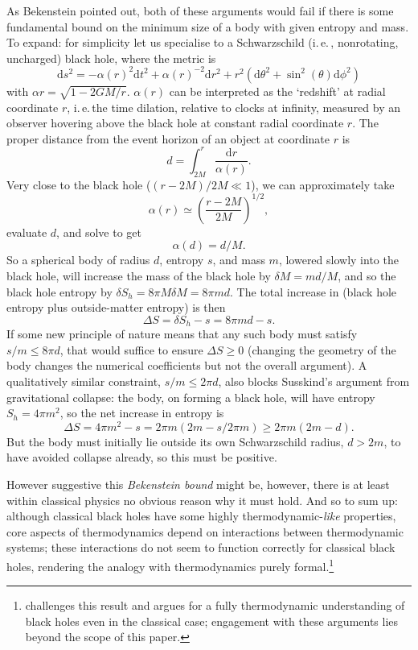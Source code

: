 \documentclass[12pt]{article}
\newcommand{\iec}{\mbox{i.\,e.\,}}
\newcommand{\be}{\begin{equation}}
\newcommand{\ee}{\end{equation}}
\begin{document}
As Bekenstein pointed out, both of these arguments would fail if there is some fundamental bound on the minimum size of a body with given entropy and mass. To expand: for simplicity let us specialise to a Schwarzschild (\iec, nonrotating, uncharged) black hole, where the metric is
\be \label{schwarzschildmetric}
\mathrm{d}s^2 = - \alpha(r)^2 \mathrm{d}t^2 + \alpha(r)^{-2} \mathrm{d}r^2 + r^2 (\mathrm{d}\theta^2 + \sin^2(\theta) \mathrm{d}\phi^2)
\ee
with $\alpha{r}=\sqrt{1-2GM/r}$. $\alpha(r)$ can be interpreted as the `redshift' at radial coordinate $r$, \iec the time dilation, relative to clocks at infinity, measured by an observer hovering above the black hole at constant radial coordinate $r$. The proper distance from the event horizon of an object at coordinate $r$ is
\be
d= \int_{2M}^r\frac{\mathrm{d}r}{\alpha(r)}.
\ee 
Very close to the black hole ($(r-2M)/2M \ll 1$), we can approximately take 
\be\alpha(r)\simeq\left( \frac{r-2M}{2M}\right)^{1/2},\ee evaluate $d$, and solve to get
\be
\alpha(d)=d/M.
\ee
So a spherical body of radius $d$, entropy $s$, and mass $m$, lowered slowly into the black hole, will increase the mass of the black hole by
$\delta M= md/M$, and so the black hole entropy by $\delta S_h = 8 \pi M \delta M= 8 \pi m d$. The total increase in (black hole entropy plus outside-matter entropy) is then
\be
\Delta S = \delta S_h - s =  8 \pi m d - s.
\ee
If some new principle of nature means that any such body must satisfy $s/m \leq 8\pi d$, that would suffice to ensure $\Delta S\geq 0$ (changing the geometry of the body changes the numerical coefficients but not the overall argument). A qualitatively similar constraint, $s/m \leq 2 \pi d$, also blocks Susskind's argument from gravitational collapse: the body, on forming a black hole, will have entropy $S_h=4\pi m^2$, so the net increase in entropy is
\be
\Delta S = 4\pi m^2 - s = 2 \pi m (2m -s/2\pi m) \geq 2\pi m (2m-d).
\ee
But the body must initially lie outside its own Schwarzschild radius, $d>2m$, to have avoided collapse already, so this must be positive. 

However suggestive this \emph{Bekenstein bound} might be, however, there is at least within classical physics no obvious reason why it must hold. And so to sum up: although classical black holes have some highly thermodynamic-\emph{like} properties, core aspects of thermodynamics depend on interactions between thermodynamic systems; these interactions do not seem to function correctly for classical black holes, rendering the analogy with thermodynamics purely formal.\footnote{ challenges this result and argues for a fully thermodynamic understanding of black holes even in the classical case; engagement with these arguments lies beyond the scope of this paper.}
 
\end{document}
